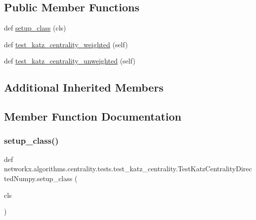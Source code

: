 \subsection*{Public Member Functions}
\begin{DoxyCompactItemize}
\item 
def \hyperlink{classnetworkx_1_1algorithms_1_1centrality_1_1tests_1_1test__katz__centrality_1_1TestKatzCentralityDirectedNumpy_a5d29cce6305e2d8d5b892c0dd145474c}{setup\+\_\+class} (cls)
\item 
def \hyperlink{classnetworkx_1_1algorithms_1_1centrality_1_1tests_1_1test__katz__centrality_1_1TestKatzCentralityDirectedNumpy_a042a0f91a6821d59045d99fe1c6d0ca1}{test\+\_\+katz\+\_\+centrality\+\_\+weighted} (self)
\item 
def \hyperlink{classnetworkx_1_1algorithms_1_1centrality_1_1tests_1_1test__katz__centrality_1_1TestKatzCentralityDirectedNumpy_a2ba7adbbff4fe4726556d12e52a459b3}{test\+\_\+katz\+\_\+centrality\+\_\+unweighted} (self)
\end{DoxyCompactItemize}
\subsection*{Additional Inherited Members}


\subsection{Member Function Documentation}
\mbox{\label{classnetworkx_1_1algorithms_1_1centrality_1_1tests_1_1test__katz__centrality_1_1TestKatzCentralityDirectedNumpy_a5d29cce6305e2d8d5b892c0dd145474c}} 
\subsubsection{\texorpdfstring{setup\+\_\+class()}{setup\_class()}}
{\footnotesize\ttfamily def networkx.\+algorithms.\+centrality.\+tests.\+test\+\_\+katz\+\_\+centrality.\+Test\+Katz\+Centrality\+Directed\+Numpy.\+setup\+\_\+class (\begin{DoxyParamCaption}\item[{}]{cls }\end{DoxyParamCaption})}

